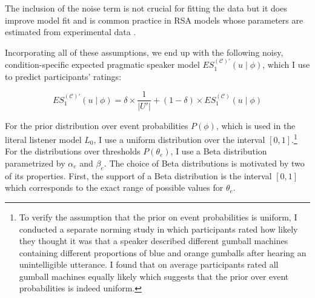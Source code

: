 \begin{itemize}
The inclusion of the noise term is not crucial for fitting the data but it does improve model fit and
is common practice in RSA models whose parameters are estimated from experimental data \parencite[see][]{Herbstritt2019,Tessler2019}.

\end{itemize}

\noindent Incorporating all of these assumptions, we end up with the following noisy, condition-specific expected pragmatic speaker 
model $ES_1^{(\mathscr{C})'}(u \mid \phi)$, which I use to predict participants' ratings:

$$ES_1^{(\mathscr{C})'}(u \mid \phi) = \delta \times \frac{1}{|U'|} +  (1 - \delta) \times ES_1^{(\mathscr{C})}(u \mid \phi)$$

For the prior distribution over event probabilities $P(\phi)$, which is used in the literal listener model $L_0$, 
I use a uniform distribution over the interval $[0,1]$.\footnote{To 
verify the assumption that the prior on event probabilities is uniform, I conducted a separate norming study in which participants rated 
how likely they thought it was that a speaker described different gumball machines containing different 
proportions of blue and orange gumballs after hearing an unintelligible utterance. I found that on average 
participants rated all gumball machines equally likely which suggests that the prior over event probabilities is 
indeed uniform.} For the distributions over thresholds $P(\theta_e)$, I use a Beta distribution parametrized by 
$\alpha_e$ and $\beta_e$. The choice of Beta distributions is motivated by two of its properties. First, the support of a Beta distribution 
is the interval $[0,1]$ which corresponds to the exact range of possible values for $\theta_e$.


